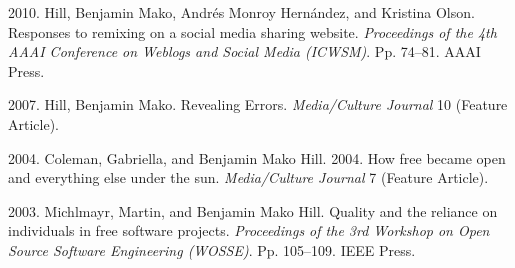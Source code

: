 \documentclass[10pt]{article}
\newenvironment{cvlist}{
\begin{list}{}{\leftmargin=3.0em \itemindent=-3.0em}
  \setlength{\itemsep}{0pt}
  \setlength{\parskip}{0em}
  \setlength{\parsep}{1em}
  \setlength{\parindent}{0em}}
{\vspace{1em}
\end{list}}
\begin{document}
\begin{cvlist}
\item 2010. Hill, Benjamin Mako, Andrés Monroy Hernández, and Kristina Olson. Responses to remixing on a social media sharing website. \emph{Proceedings of the 4th AAAI Conference on Weblogs and Social Media (ICWSM)}. Pp. 74--81. AAAI Press. %
\item 2007. Hill, Benjamin Mako. Revealing Errors. \emph{Media/Culture Journal} 10 (Feature Article).
\item 2004. Coleman, Gabriella, and Benjamin Mako Hill. 2004. How free became open and everything else under the sun. \emph{Media/Culture Journal} 7 (Feature Article).
\item 2003. Michlmayr, Martin, and Benjamin Mako Hill. Quality and the reliance on individuals in free software projects. \emph{Proceedings of the 3rd Workshop on Open Source Software Engineering (WOSSE)}. Pp. 105--109. IEEE Press.
\end{cvlist}
\end{document}
